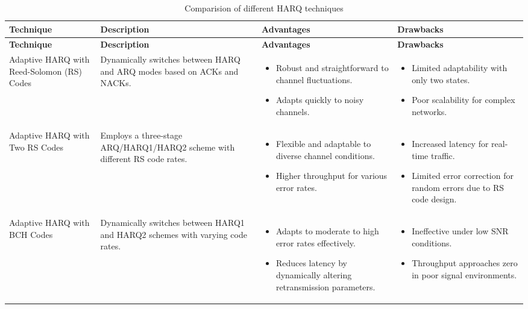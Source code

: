\documentclass[sn-mathphys-num]{sn-jnl}
\theoremstyle{thmstyleone}
\theoremstyle{thmstyletwo}%
\theoremstyle{thmstylethree}%
\begin{document}
\begin{longtable}{|>{\centering\arraybackslash}m{3.2cm}|>{\centering\arraybackslash}m{4.3cm}|>{\centering\arraybackslash}m{3.75cm}|>{\centering\arraybackslash}m{3.75cm}|}
\caption{Comparision of different HARQ techniques} \label{tab:3} \\ \hline
\textbf{Technique} & \textbf{Description} & \textbf{Advantages} & \textbf{Drawbacks} \\ 
\hline
\endfirsthead
\hline
\textbf{Technique} & \textbf{Description} & \textbf{Advantages} & \textbf{Drawbacks} \\ 
\hline
\endhead
\hline
\endfoot

Adaptive HARQ with Reed-Solomon (RS) Codes \cite{r6} & Dynamically switches between HARQ and ARQ modes based on ACKs and NACKs. & 
\begin{itemize}
    \item Robust and straightforward to channel fluctuations.
    \item Adapts quickly to noisy channels.
\end{itemize} & 
\begin{itemize}
    \item Limited adaptability with only two states.
    \item Poor scalability for complex networks.
\end{itemize} \\ 
\hline

Adaptive HARQ with Two RS Codes \cite{r8}& Employs a three-stage ARQ/HARQ1/HARQ2 scheme with different RS code rates. & 
\begin{itemize}
    \item Flexible and adaptable to diverse channel conditions.
    \item Higher throughput for various error rates.
\end{itemize} & 
\begin{itemize}
    \item Increased latency for real-time traffic.
    \item Limited error correction for random errors due to RS code design.
\end{itemize} \\ 
\hline

Adaptive HARQ with BCH Codes \cite{r5} & Dynamically switches between HARQ1 and HARQ2 schemes with varying code rates. & 
\begin{itemize}
    \item Adapts to moderate to high error rates effectively.
    \item Reduces latency by dynamically altering retransmission parameters.
\end{itemize} & 
\begin{itemize}
    \item Ineffective under low SNR conditions.
    \item Throughput approaches zero in poor signal environments.
\end{itemize} \\ 
\hline


\end{longtable}
\end{document}
